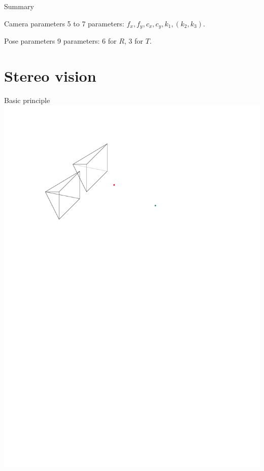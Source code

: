 \documentclass{beamer}
\begin{document}
\begin{frame}{Summary}
    \begin{block}{Camera parameters}
        5 to 7 parameters: $f_x, f_y, c_x, c_y, k_1, (k_2, k_3)$.
    \end{block}
    \begin{block}{Pose parameters}
        9 parameters: 6 for $R$, 3 for $T$.
    \end{block}
\end{frame}
\section{Stereo vision}
\begin{frame}
    \tableofcontents[sectionstyle=show/shaded]
\end{frame}
\begin{frame}{Basic principle}
    \includegraphics[width=\textwidth]{images/stereo.pdf}
\end{frame}
\end{document}

